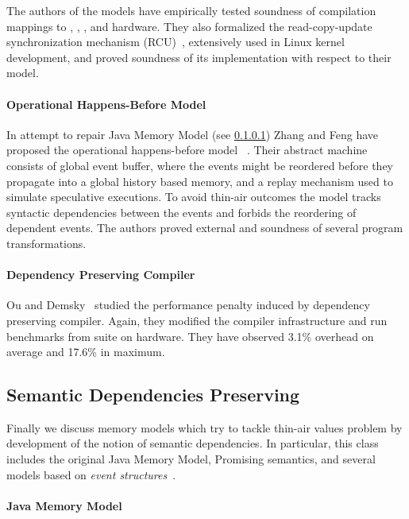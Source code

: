 The authors of the models have empirically tested 
soundness of compilation mappings to 
\Intel, , , and \POWER hardware. 
They also formalized the read-copy-update 
synchronization mechanism (RCU)~\cite{McKenney-RCU2007}, 
extensively used in Linux kernel development, 
and proved soundness of its implementation with respect to their model.

\paragraph{Operational Happens-Before Model}

In attempt to repair Java Memory Model (see \cref{sec:catalog:jmm})
Zhang and Feng have proposed the 
operational happens-before model \OHMM~\cite{Zhang-Feng:FCS16}.
Their abstract machine consists of global event buffer,
where the events might be reordered before they propagate into  
a global history based memory, and a replay mechanism 
used to simulate speculative executions. 
To avoid thin-air outcomes the model tracks syntactic dependencies 
between the events and forbids the reordering of dependent events. 
The authors proved external \DRF and soundness of several 
program transformations. 

\paragraph{Dependency Preserving Compiler}

Ou and Demsky~\cite{Ou-Demsky:OOPSLA18} studied 
the performance penalty induced by dependency preserving compiler. 
Again, they modified the \LLVM compiler infrastructure 
and run benchmarks from \SPECCPU suite on  hardware. 
They have observed 3.1\% overhead on average and 17.6\% in maximum. 

\subsection{Semantic Dependencies Preserving}
\label{sec:catalog:sdeprf}

Finally we discuss memory models 
which try to tackle thin-air values problem 
by development of the notion of semantic dependencies. 
In particular, this class includes the original Java Memory Model, 
Promising semantics, and several models based 
on \emph{event structures}~\cite{Winskel:86}.

\paragraph{Java Memory Model}
\label{sec:catalog:jmm}

